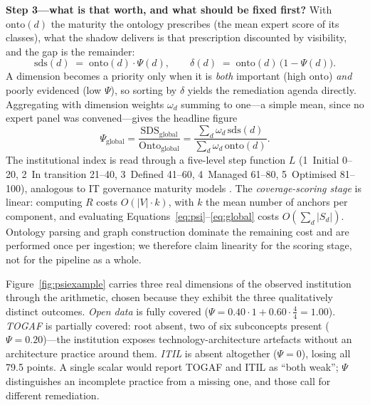 \documentclass[engproc,proceedingpaper,submit,moreauthors]{Definitions/mdpi}
\begin{document}
\textbf{Step 3---what is that worth, and what should be fixed first?} With $\mathrm{onto}(d)$ the maturity the ontology prescribes (the mean expert score of its classes), what the shadow delivers is that prescription discounted by visibility, and the gap is the remainder:
\begin{equation}
\mathrm{sds}(d) \;=\; \mathrm{onto}(d)\cdot\Psi(d),
\qquad
\delta(d) \;=\; \mathrm{onto}(d)\,\bigl(1-\Psi(d)\bigr).
\label{eq:delta}
\end{equation}
A dimension becomes a priority only when it is \emph{both} important (high $\mathrm{onto}$) \emph{and} poorly evidenced (low $\Psi$), so sorting by $\delta$ yields the remediation agenda directly. Aggregating with dimension weights $\omega_d$ summing to one---a simple mean, since no expert panel was convened---gives the headline figure
\begin{equation}
\Psi_{\mathrm{global}}=\frac{\mathrm{SDS}_{\mathrm{global}}}{\mathrm{Onto}_{\mathrm{global}}}=\frac{\sum_d \omega_d\,\mathrm{sds}(d)}{\sum_d \omega_d\,\mathrm{onto}(d)}.
\label{eq:global}
\end{equation} The institutional index is read through a five-level step function $L$ (1~Initial 0--20, 2~In transition 21--40, 3~Defined 41--60, 4~Managed 61--80, 5~Optimised 81--100), analogous to IT governance maturity models \cite{DeHaes2013}. The \emph{coverage-scoring stage} is linear: computing $R$ costs $O(|V|\cdot k)$, with $k$ the mean number of anchors per component, and evaluating Equations~\eqref{eq:psi}--\eqref{eq:global} costs $O(\sum_d|S_d|)$. Ontology parsing and graph construction dominate the remaining cost and are performed once per ingestion; we therefore claim linearity for the scoring stage, not for the pipeline as a whole.

Figure~\ref{fig:psiexample} carries three real dimensions of the observed institution through the arithmetic, chosen because they exhibit the three qualitatively distinct outcomes. \emph{Open data} is fully covered ($\Psi=0.40\cdot 1+0.60\cdot\frac{4}{4}=1.00$). \emph{TOGAF} is partially covered: root absent, two of six subconcepts present ($\Psi=0.20$)---the institution exposes technology-architecture artefacts without an architecture practice around them. \emph{ITIL} is absent altogether ($\Psi=0$), losing all 79.5 points. A single scalar would report TOGAF and ITIL as ``both weak''; $\Psi$ distinguishes an incomplete practice from a missing one, and those call for different remediation.
\end{document}

